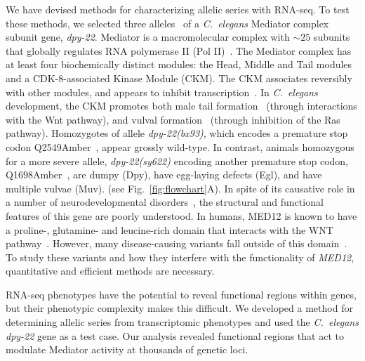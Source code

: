 \documentclass[8pt, twocolumn]{article}
\newcommand{\cel}{\emph{C.~elegans}}
\newcommand{\gene}[1]{\mbox{\emph{#1}}}
\newcommand{\protein}[1]{\mbox{\uppercase{#1}}}
\newcommand{\dpy}[1]{\gene{dpy-22#1}}
\begin{document}
We have devised methods for characterizing allelic series with RNA-seq. To test
these methods, we selected three alleles~\cite{Zhang2000,Moghal2003} of a \cel{}
Mediator complex subunit gene, \dpy{}. Mediator is a macromolecular complex with
$\sim25$ subunits~\cite{Jeronimo2017} that globally regulates RNA polymerase II
(Pol II)~\cite{Allen2015,Takagi2006}. The Mediator complex has at least four
biochemically distinct modules: the Head, Middle and Tail modules and a
CDK-8-associated Kinase Module (CKM). The CKM associates reversibly with other
modules, and appears to inhibit transcription~\cite{Knuesel2009,Elmlund2006}. In
\cel{} development, the CKM promotes both male tail formation~\cite{Zhang2000}
(through interactions with the Wnt pathway), and vulval
formation~\cite{Moghal2003a} (through inhibition of the Ras pathway).
Homozygotes of allele \gene{dpy-22(bx93)}, which encodes a premature stop codon
Q2549Amber~\cite{Zhang2000}, appear grossly wild-type. In contrast, animals
homozygous for a more severe allele, \gene{dpy-22(sy622)} encoding another
premature stop codon, Q1698Amber~\cite{Moghal2003}, are dumpy (Dpy), have
egg-laying defects (Egl), and have multiple vulvae (Muv).
(see Fig.~\ref{fig:flowchart}A).
In spite of its causative role in a number of neurodevelopmental
disorders~\cite{Graham2013}, the structural and functional features of this gene
are poorly understood. In humans, \protein{MED12} is known to have a proline-,
glutamine- and leucine-rich domain that interacts with the WNT
pathway~\cite{Kim2006}. However,
many disease-causing variants fall outside of this domain~\cite{Yamamoto2015}.
To study these variants and how they interfere with the functionality of
\gene{MED12}, quantitative and efficient methods are necessary.

RNA-seq phenotypes have the potential to reveal functional regions within genes,
but their phenotypic complexity makes this difficult. We developed a
method for determining allelic series from transcriptomic phenotypes and used
the \cel{} \dpy{} gene as a test case. Our analysis revealed functional regions
that act to modulate Mediator activity at thousands of genetic loci.
\end{document}
